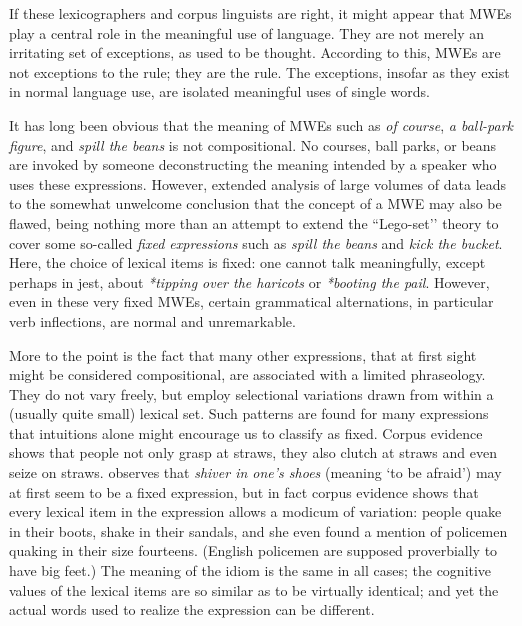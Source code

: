 \documentclass[output=paper]{langsci/langscibook}
\begin{document}

If these lexicographers and corpus linguists are right, it might appear
that MWEs play a central role in the meaningful use of language. They
are not merely an irritating set of exceptions, as used to be thought.
According to this, MWEs are not exceptions to the rule; they are the
rule. The exceptions, insofar as they exist in normal language use, are
isolated meaningful uses of single words.



It has long been obvious that the meaning of MWEs such as \textit{of course},
\textit{a ball-park figure}, and \textit{spill the beans} is not compositional. No
courses, ball parks, or beans are invoked by someone deconstructing the
meaning intended by a speaker who uses these expressions. However,
extended analysis of large volumes of data leads to the somewhat
unwelcome conclusion that the concept of a MWE may also be flawed,
being nothing more than an attempt to extend the ``Lego-set’' theory to
  cover some so-called \textit{fixed expressions}  such as \textit{spill the beans} and
\textit{kick the bucket}. Here, the choice of lexical items is fixed: one
cannot talk meaningfully, except perhaps in jest, about \textit{*tipping over
the haricots} or \textit{*booting the pail}. However, even in these very fixed
MWEs, certain grammatical alternations, in particular verb inflections,
are normal and unremarkable.



More to the point is the fact that many other expressions, that at first
sight might be considered compositional, are associated with a limited
phraseology. They do not vary freely, but employ selectional variations
drawn from within a (usually quite small) lexical set. Such patterns
are found for many expressions that intuitions alone might encourage us
to classify as fixed. Corpus evidence shows that people not only grasp
at straws, they also clutch at straws and even seize on straws. \cite{moon1998} observes that \textit{shiver in one’s shoes} (meaning `to be afraid') may
at first seem to be a fixed expression, but in fact corpus evidence
shows that every lexical item in the expression allows a modicum of
variation: people quake in their boots, shake in their sandals, and she
even found a mention of policemen quaking in their size fourteens.
(English policemen are supposed proverbially to have big feet.) The
meaning of the idiom is the same in all cases; the cognitive values of
the lexical items are so similar as to be virtually identical; and yet
the actual words used to realize the expression can be different. 
\end{document}
